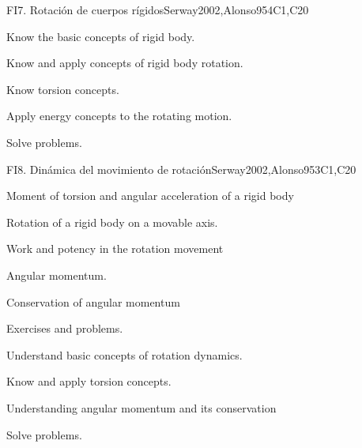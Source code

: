 \begin{syllabus}
\begin{unit}{FI7. Rotación de cuerpos rígidos}{}{Serway2002,Alonso95}{4}{C1,C20}
   \begin{learningoutcomes}
      \item Know the basic concepts of rigid body.
      \item Know and apply concepts of rigid body rotation.
      \item Know torsion concepts.
      \item Apply energy concepts to the rotating motion.
      \item Solve problems.
   \end{learningoutcomes}
\end{unit}

\begin{unit}{FI8. Dinámica del movimiento de rotación}{}{Serway2002,Alonso95}{3}{C1,C20}
\begin{topics}
      \item Moment of torsion and angular acceleration of a rigid body
      \item Rotation of a rigid body on a movable axis.
      \item Work and potency in the rotation movement
      \item Angular momentum.
      \item Conservation of angular momentum
      \item Exercises and problems.
    \end{topics}

   \begin{learningoutcomes}
      \item Understand basic concepts of rotation dynamics.
      \item Know and apply torsion concepts.
      \item Understanding angular momentum and its conservation
      \item Solve problems.
   \end{learningoutcomes}
\end{unit}

\begin{coursebibliography}
\end{coursebibliography}
\end{syllabus}
